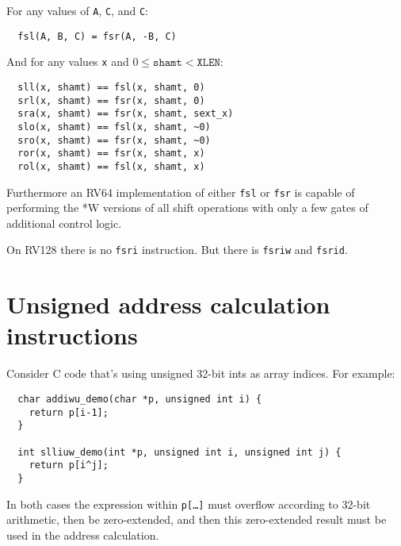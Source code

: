 For any values of {\tt A}, {\tt C}, and {\tt C}:

\begin{minipage}{\linewidth}
\begin{verbatim}
  fsl(A, B, C) = fsr(A, -B, C)
\end{verbatim}
\end{minipage}

And for any values {\tt x} and $0 \le \texttt{shamt} < \texttt{XLEN}$:

\begin{minipage}{\linewidth}
\begin{verbatim}
  sll(x, shamt) == fsl(x, shamt, 0)
  srl(x, shamt) == fsr(x, shamt, 0)
  sra(x, shamt) == fsr(x, shamt, sext_x)
  slo(x, shamt) == fsl(x, shamt, ~0)
  sro(x, shamt) == fsr(x, shamt, ~0)
  ror(x, shamt) == fsr(x, shamt, x)
  rol(x, shamt) == fsl(x, shamt, x)
\end{verbatim}
\end{minipage}

Furthermore an RV64 implementation of either {\tt fsl} or {\tt fsr} is capable
of performing the *W versions of all shift operations with only a few gates
of additional control logic.

On RV128 there is no {\tt fsri} instruction. But there is {\tt fsriw} and {\tt fsrid}.


\section{Unsigned address calculation instructions}

Consider C code that's using unsigned 32-bit ints as array indices. For example:

\begin{minipage}{\linewidth}
\begin{verbatim}
  char addiwu_demo(char *p, unsigned int i) {
    return p[i-1];
  }

  int slliuw_demo(int *p, unsigned int i, unsigned int j) {
    return p[i^j];
  }
\end{verbatim}
\end{minipage}

In both cases the expression within {\tt p[\dots]} must overflow according to
32-bit arithmetic, then be zero-extended, and then this zero-extended result
must be used in the address calculation.

